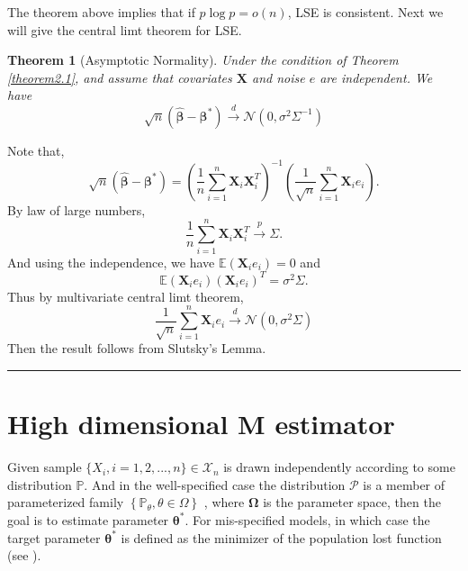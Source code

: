 \documentclass[12pt]{article}
\numberwithin{equation}{section}
\newtheorem{theorem}{Theorem}[section]
\newenvironment{proof}{{\bf Proof:}}{\hfill\rule{2mm}{2mm}}
\begin{document}
The theorem above implies that if $p\log p=o(n)$, LSE is consistent. Next we will give the central limt theorem for LSE.
\begin{theorem}[Asymptotic Normality]
	Under the condition of Theorem \ref{theorem2.1}, and assume that covariates $\boldsymbol{X}$ and noise $e$ are independent. We have
	\begin{equation}
	\sqrt{n}\left(\boldsymbol{\widehat{\beta}}-\boldsymbol{\beta}^{*}\right) \stackrel{d}{\longrightarrow} \mathcal{N}\left(0, \sigma^2\Sigma^{-1}\right)
	\end{equation}
\end{theorem}
\begin{proof}
	Note that,
	\begin{equation}
	\sqrt{n}\left(\boldsymbol{\widehat{\beta}}-\boldsymbol{\beta}^{*}\right)=\left(\frac{1}{n}\sum_{i=1}^{n}\boldsymbol{X}_i\boldsymbol{X}_i^T\right)^{-1}\left(\frac{1}{\sqrt{n}}\sum_{i=1}^n\boldsymbol{X}_ie_i\right).
	\end{equation}
	By law of large numbers,
	$$
	\frac{1}{n}\sum_{i=1}^{n}\boldsymbol{X}_i\boldsymbol{X}_i^T\stackrel{p}{\longrightarrow}\Sigma.
	$$
	And using the independence, we have $\mathbb{E}\left(\boldsymbol{X}_ie_i\right)=0$ and
	$$
	\mathbb{E}\left(\boldsymbol{X}_ie_i\right)\left(\boldsymbol{X}_ie_i\right)^T=\sigma^2\Sigma.
	$$
	Thus by multivariate central limt theorem,
	$$
	\frac{1}{\sqrt{n}}\sum_{i=1}^n\boldsymbol{X}_ie_i\stackrel{d}{\longrightarrow}\mathcal{N}\left(0,\sigma^2\Sigma\right)
	$$
	Then the result follows from Slutsky's Lemma.
\end{proof}

\section{High dimensional M estimator}\label{section3}
Given sample $\{X_i,i=1,2,...,n\}\in \mathcal{X}_n$ is drawn independently according to
some distribution $\mathbb{P}$. And in the well-specified case the distribution
$\mathcal{P}$ is a member of parameterized family $\left\{\mathbb{P}_{\theta}, \theta \in \Omega\right\}$ , where $\boldsymbol{\Omega}$ is the parameter space, then the goal is to estimate parameter $\boldsymbol{\theta}^{*}$. For mis-specified models, in which case the target parameter $\boldsymbol{\theta}^{*}$ is defined as the minimizer of the population lost function (see \citet{wainwright2019high}). 
\end{document}
